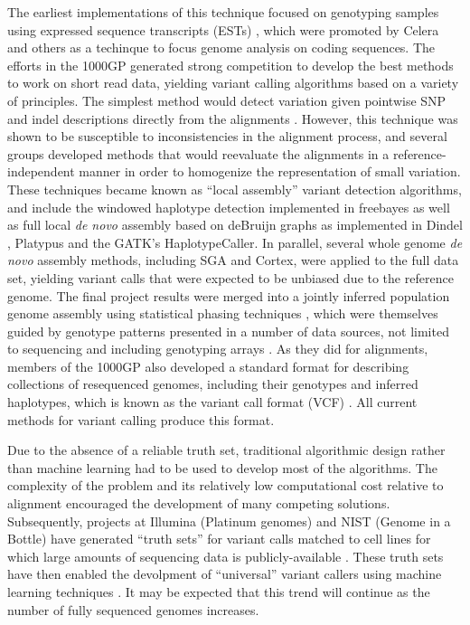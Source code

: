 The earliest implementations of this technique focused on genotyping samples using expressed sequence transcripts (ESTs) \cite{marth1999general}, which were promoted by Celera and others as a techinque to focus genome analysis on coding sequences.
The efforts in the 1000GP generated strong competition to develop the best methods to work on short read data, yielding variant calling algorithms based on a variety of principles.
The simplest method would detect variation given pointwise SNP and indel descriptions directly from the alignments \cite{li2009sequence,gatk2011}.
However, this technique was shown to be susceptible to inconsistencies in the alignment process, and several groups developed methods that would reevaluate the alignments in a reference-independent manner in order to homogenize the representation of small variation.
These techniques became known as ``local assembly'' variant detection algorithms, and include the windowed haplotype detection implemented in freebayes \cite{garrison2012haplotype} as well as full local \emph{de novo} assembly based on deBruijn graphs as implemented in Dindel \cite{albers2010dindel}, Platypus \cite{rimmer2014integrating} and the GATK's HaplotypeCaller.
In parallel, several whole genome \emph{de novo} assembly methods, including SGA and Cortex, were applied to the full data set, yielding variant calls that were expected to be unbiased due to the reference genome.
The final project results were merged into a jointly inferred population genome assembly using statistical phasing techniques \cite{browning2007,howie2011,delaneau2012}, which were themselves guided by genotype patterns presented in a number of data sources, not limited to sequencing and including genotyping arrays \cite{1000g2015}.
As they did for alignments, members of the 1000GP also developed a standard format for describing collections of resequenced genomes, including their genotypes and inferred haplotypes, which is known as the variant call format (VCF) \cite{danecek2011variant}.
All current methods for variant calling produce this format.

Due to the absence of a reliable truth set, traditional algorithmic design rather than machine learning had to be used to develop most of the algorithms.
The complexity of the problem and its relatively low computational cost relative to alignment encouraged the development of many competing solutions.
Subsequently, projects at Illumina (Platinum genomes) and NIST (Genome in a Bottle) have generated ``truth sets'' for variant calls matched to cell lines for which large amounts of sequencing data is publicly-available \cite{eberle2013platinum,zook2014integrating}.
These truth sets have then enabled the devolpment of ``universal'' variant callers using machine learning techniques \cite{poplin2017creating}.
It may be expected that this trend will continue as the number of fully sequenced genomes increases.

